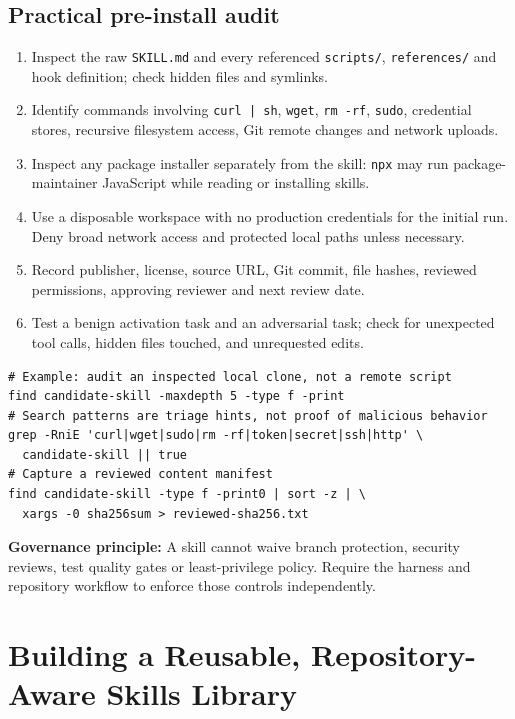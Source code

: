 \documentclass[11pt,letterpaper]{article}
\begin{document}
\subsection{Practical pre-install audit}
\begin{enumerate}
\item Inspect the raw \texttt{SKILL.md} and every referenced \texttt{scripts/}, \texttt{references/} and hook definition; check hidden files and symlinks.
\item Identify commands involving \texttt{curl | sh}, \texttt{wget}, \texttt{rm -rf}, \texttt{sudo}, credential stores, recursive filesystem access, Git remote changes and network uploads.
\item Inspect any package installer separately from the skill: \texttt{npx} may run package-maintainer JavaScript while reading or installing skills.
\item Use a disposable workspace with no production credentials for the initial run. Deny broad network access and protected local paths unless necessary.
\item Record publisher, license, source URL, Git commit, file hashes, reviewed permissions, approving reviewer and next review date.
\item Test a benign activation task and an adversarial task; check for unexpected tool calls, hidden files touched, and unrequested edits.
\end{enumerate}
\begin{verbatim}
# Example: audit an inspected local clone, not a remote script
find candidate-skill -maxdepth 5 -type f -print
# Search patterns are triage hints, not proof of malicious behavior
grep -RniE 'curl|wget|sudo|rm -rf|token|secret|ssh|http' \
  candidate-skill || true
# Capture a reviewed content manifest
find candidate-skill -type f -print0 | sort -z | \
  xargs -0 sha256sum > reviewed-sha256.txt
\end{verbatim}
\textbf{Governance principle:} A skill cannot waive branch protection, security reviews, test quality gates or least-privilege policy. Require the harness and repository workflow to enforce those controls independently.

\section{Building a Reusable, Repository-Aware Skills Library}
\end{document}
